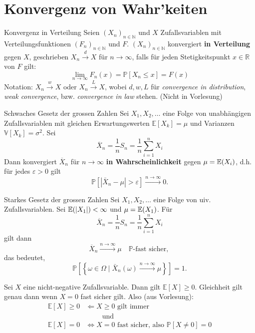 \section{Konvergenz von Wahr'keiten}

\begin{mainbox}{Konvergenz in Verteilung}
	Seien $\left(X_n\right)_{n \in \mathbb{N}}$ und $X$ Zufallsvariablen mit Verteilungsfunktionen $\left(F_n\right)_{n \in \mathbb{N}}$ und $F$. $\left(X_n\right)_{n \in \mathbb{N}}$ konvergiert \textbf{in Verteilung} gegen $X$, geschrieben $X_n \xrightarrow{d} X$ für $n \rightarrow \infty$, falls für jeden Stetigkeitspunkt $x \in \mathbb{R}$ von $F$ gilt:
$$
\lim_{n \rightarrow \infty} F_n(x)=\mathbb{P}\left[X_n \leq x\right]=F(x)
$$
Notation: $X_n \xrightarrow{w} X$ oder $X_n \xrightarrow{L} X$, wobei $d, w, L$ für \textit{convergence in distribution}, \textit{weak convergence}, bzw. \textit{convergence in law} stehen. (Nicht in Vorlesung)
\end{mainbox}

\begin{mainbox}{Schwaches Gesetz der grossen Zahlen}
    Sei $X_1, X_2, \ldots$ eine Folge von unabhängigen Zufallsvariablen mit gleichen Erwartungswerten $\mathbb{E}\left[X_k\right]=\mu$ und Varianzen $\mathbb{V}\left[X_k\right]=\sigma^2$. 
    Sei
    $$\overline{X}_n = \frac{1}{n}S_n = \frac{1}{n}\sum_{i = 1}^{n}X_i$$
    Dann konvergiert $\overline{X}_n$ für $n \to \infty$ \textbf{in Wahrscheinlichkeit} gegen $\mu = \mathbb{E}(X_i)$, d.h. für jedes $\varepsilon>0$ gilt
    $$\mathbb{P}\left[\left|\bar{X}_n-\mu\right|>\varepsilon\right] \xrightarrow{n \rightarrow \infty} 0 .$$
    
\end{mainbox}

\begin{mainbox}{Starkes Gesetz der grossen Zahlen}
    Sei $X_1, X_2, \ldots$ eine Folge von uiv. Zufallsvariablen. Sei $\mathbb{E}(|X_1|)<\infty$ und $\mu = \mathbb{E}(X_1)$. Für
    $$\overline{X}_n = \frac{1}{n}S_n = \frac{1}{n}\sum_{i = 1}^{n}X_i$$
    gilt dann
    $$\overline{X}_n \xrightarrow{n \rightarrow \infty} \mu \quad \mathbb{P} \text {-fast sicher, }$$
    das bedeutet,
	$$
	\mathbb{P}\left[\left\{\omega \in \Omega \mid \bar{X}_n(\omega) \xrightarrow{n \rightarrow \infty} \mu\right\}\right]=1 .
	$$
\end{mainbox}

\begin{subbox}{}
Sei $X$ eine nicht-negative Zufallsvariable. Dann gilt $\mathbb{E}[X] \geq 0$. Gleichheit gilt genau dann wenn $X=0$ fast sicher gilt.  
Also (aus Vorlesung): 
$$
\begin{aligned}
\mathbb{E}[X]\geq0 &\Longleftarrow X\geq0 \text{ gilt immer}\\
&\hspace{1cm}\text{und}\\
\mathbb{E}[X]=0 &\iff X=0 \text{ fast sicher, also }\mathbb{P}[X\neq 0]=0\\
\end{aligned}
$$

\end{subbox}

